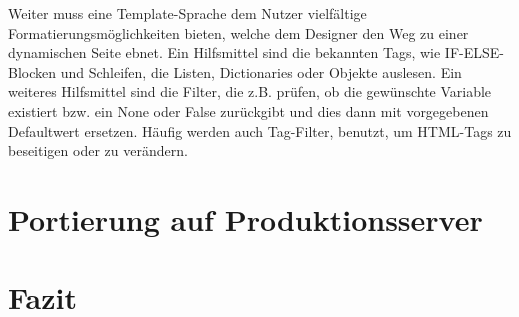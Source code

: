 \documentclass[titlepage, 12pt,a4paper]{scrartcl}
\begin{document}
Weiter muss eine Template-Sprache dem Nutzer vielfältige 
Formatierungsmöglichkeiten bieten, welche dem Designer den Weg zu einer 
dynamischen Seite ebnet. Ein Hilfsmittel sind die bekannten Tags, wie 
IF-ELSE-Blocken und Schleifen, die Listen, Dictionaries oder Objekte auslesen. 
Ein weiteres Hilfsmittel sind die Filter, die z.B. prüfen, ob die gewünschte 
Variable existiert bzw. ein None oder False zurückgibt und dies dann mit 
vorgegebenen Defaultwert ersetzen. Häufig werden auch Tag-Filter, benutzt, um 
HTML-Tags zu beseitigen oder zu verändern.

\section{Portierung auf Produktionsserver}
\section{Fazit}
\end{document}
